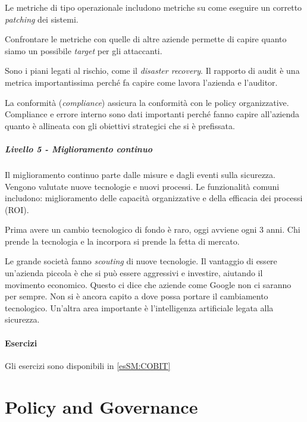 
Le metriche di tipo operazionale includono metriche su come eseguire 
un corretto \textit{patching} dei sistemi.

Confrontare le metriche con quelle di altre aziende permette di capire quanto 
siamo un possibile \textit{target} per gli attaccanti.


Sono i piani legati al rischio, come il \textit{disaster recovery}.
Il rapporto di audit è una metrica importantissima perché fa capire come lavora 
l'azienda e l'auditor.


La conformità (\textit{compliance}) assicura la conformità con le policy 
organizzative. Compliance e errore interno sono dati importanti perché 
fanno capire all'azienda quanto è allineata con gli obiettivi strategici che si 
è prefissata.


\paragraph{Livello 5 - Miglioramento continuo}

Il miglioramento continuo parte dalle misure e dagli eventi sulla sicurezza.
Vengono valutate nuove tecnologie e nuovi processi. Le funzionalità comuni 
includono: miglioramento delle capacità organizzative e della efficacia dei 
processi (ROI).

Prima avere un cambio tecnologico di fondo è raro, oggi avviene ogni 3 anni. Chi 
prende la tecnologia e la incorpora si prende la fetta di mercato.

Le grande società fanno \textit{scouting} di nuove tecnologie. Il vantaggio di 
essere un'azienda piccola è che si può essere aggressivi e investire, aiutando 
il movimento economico. Questo ci dice che aziende come Google non ci 
saranno per sempre. Non si è ancora capito a dove possa portare il cambiamento
tecnologico. Un'altra area importante è l'intelligenza artificiale legata 
alla sicurezza.


\subsubsection{Esercizi}

Gli esercizi sono disponibili in \ref{esSM:COBIT}

\chapter{Policy and Governance}
\label{PG}

